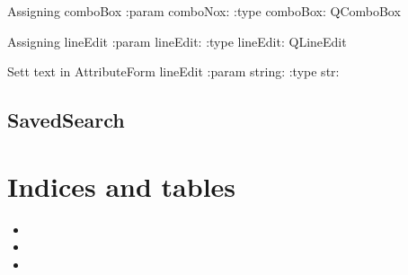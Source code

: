 \documentclass[letterpaper,10pt,english]{sphinxmanual}
\begin{document}
\begin{fulllineitems}
\begin{fulllineitems}
\end{fulllineitems}


\begin{fulllineitems}
\label{\detokenize{code:AttributeForm.AttributeForm.setComboBox}}
Assigning comboBox
:param comboNox:
:type comboBox: QComboBox

\end{fulllineitems}


\begin{fulllineitems}
\label{\detokenize{code:AttributeForm.AttributeForm.setLineEdit}}
Assigning lineEdit
:param lineEdit:
:type lineEdit: QLineEdit

\end{fulllineitems}


\begin{fulllineitems}
\label{\detokenize{code:AttributeForm.AttributeForm.setLineEditText}}
Sett text in AttributeForm lineEdit
:param string:
:type str:

\end{fulllineitems}


\end{fulllineitems}



\section{SavedSearch}
\label{\detokenize{code:savedsearch}}

\begin{fulllineitems}
\label{\detokenize{code:SavedSearch.SavedSearch}}
\end{fulllineitems}



\chapter{Indices and tables}
\label{\detokenize{index:indices-and-tables}}\begin{itemize}
\item {} 

\item {} 

\item {} 

\end{itemize}



\renewcommand{\indexname}{Index}
\printindex
\end{document}
